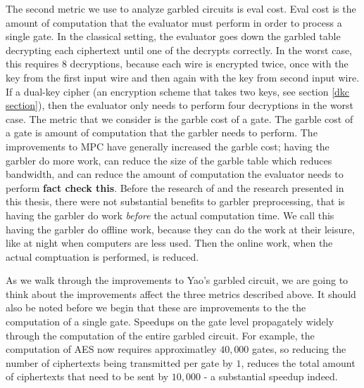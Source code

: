 \documentclass[12pt,twoside]{reedthesis}
\begin{document}
The second metric we use to analyze garbled circuits is eval cost.
Eval cost is the amount of computation that the evaluator must perform in order to process a single gate.
In the classical setting, the evaluator goes down the garbled table decrypting each ciphertext until one of the decrypts correctly. 
In the worst case, this requires 8 decryptions, because each wire is encrypted twice, once with the key from the first input wire and then again with the key from second input wire.
If a dual-key cipher (an encryption scheme that takes two keys, see section \ref{dkc section}), then the evaluator only needs to perform four decryptions in the worst case.
The metric that we consider is the garble cost of a gate. 
The garble cost of a gate is amount of computation that the garbler needs to perform.
The improvements to MPC have generally increased the garble cost; having the garbler do more work, can reduce the size of the garble table which reduces bandwidth, and can reduce the amount of computation the evaluator needs to perform \textbf{fact check this}.
Before the research of \cite{our_paper} and the research presented in this thesis, there were not substantial benefits to garbler preprocessing, that is having the garbler do work \textit{before} the actual computation time. 
We call this having the garbler do offline work, because they can do the work at their leisure, like at night when computers are less used.
Then the online work, when the actual comptuation is performed, is reduced.

As we walk through the improvements to Yao's garbled circuit, we are going to think about the improvements affect the three metrics described above.
It should also be noted before we begin that these are improvements to the the computation of a single gate.
Speedups on the gate level propagately widely through the computation of the entire garbled circuit.
For example, the computation of AES now requires approximatley $40,000$ gates, so reducing the number of ciphertexts being transmitted per gate by $1$, reduces the total amount of ciphertexts that need to be sent by $10,000$ - a substantial speedup indeed.
\end{document}
